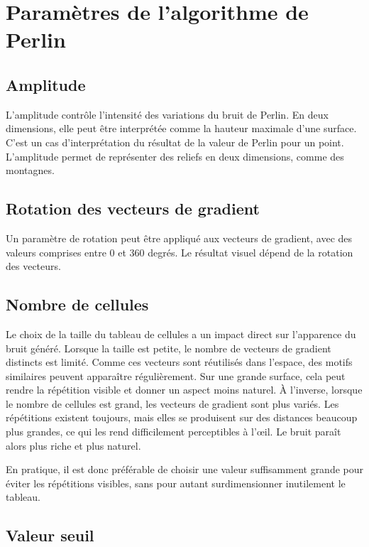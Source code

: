 \section{Paramètres de l'algorithme de Perlin}

\subsection{Amplitude}

L’amplitude contrôle l’intensité des variations du bruit de Perlin. En deux dimensions, elle peut être interprétée comme la hauteur maximale d’une surface.
C'est un cas d'interprétation du résultat de la valeur de Perlin pour un point. 
L'amplitude permet de représenter des reliefs en deux dimensions, comme des montagnes. 

\subsection{Rotation des vecteurs de gradient}

Un paramètre de rotation peut être appliqué aux vecteurs de gradient, avec des valeurs comprises entre $0$ et $360$ degrés.
Le résultat visuel dépend de la rotation des vecteurs.

\subsection{Nombre de cellules}

Le choix de la taille du tableau de cellules a un impact direct sur l’apparence du bruit généré.
Lorsque la taille est petite, le nombre de vecteurs de gradient distincts est limité.
Comme ces vecteurs sont réutilisés dans l’espace, des motifs similaires peuvent apparaître régulièrement. 
Sur une grande surface, cela peut rendre la répétition visible et donner un aspect moins naturel.
À l’inverse, lorsque le nombre de cellules est grand, les vecteurs de gradient sont plus variés.
Les répétitions existent toujours, mais elles se produisent sur des distances beaucoup plus grandes, ce qui les rend difficilement perceptibles à l’œil.
Le bruit paraît alors plus riche et plus naturel.

En pratique, il est donc préférable de choisir une valeur suffisamment grande pour éviter les répétitions visibles, sans pour autant surdimensionner inutilement le tableau.

\subsection{Valeur seuil}

